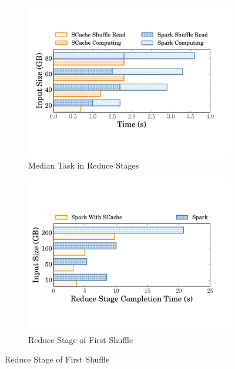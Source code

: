 \begin{figure}
\begin{minipage}[t]{.32\linewidth}
\begin{subfigure}{\linewidth}
			\begin{minipage}{\linewidth}
				\includegraphics[width=\linewidth]{fig/groupbyreducetask}
				\caption{Median Task in Reduce Stages}
				\label{fig:reducetask}
			\end{minipage}
		\end{subfigure}
		\caption{Median Task Completion Time of Single Shuffle Test}
		\label{fig:singleshuffletask}
	\end{minipage}	
	\begin{minipage}[t]{.32\linewidth}
		\begin{subfigure}{\linewidth}
			\begin{minipage}{\linewidth}
				\includegraphics[width=\linewidth]{fig/tera}
				\caption{Reduce Stage of First Shuffle}
				\label{fig:terasort}
			\end{minipage}


\end{subfigure}
\end{minipage}
\end{figure}
